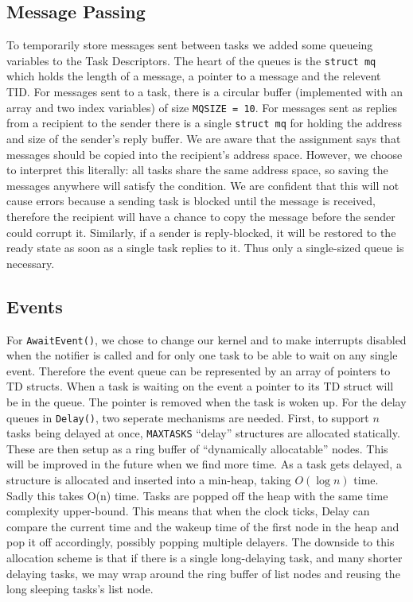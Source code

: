 \documentclass{article}
\begin{document}
\subsection{Message Passing}
To temporarily store messages sent between tasks we added some queueing
variables to the Task Descriptors. The heart of the queues is the \texttt{struct
mq} which holds the length of a message, a pointer to a message and the relevent
TID. For messages sent to a task, there is a circular buffer (implemented with
an array and two index variables) of size \texttt{MQSIZE = 10}. For messages
sent as replies from a recipient to the sender there is a single \texttt{struct
mq} for holding the address and size of the sender's reply buffer. We are aware
that the assignment says that messages should be copied into the recipient's
address space.  However, we choose to interpret this literally: all tasks share
the same address space, so saving the messages anywhere will satisfy the
condition. We are confident that this will not cause errors because a sending
task is blocked until the message is received, therefore the recipient will have
a chance to copy the message before the sender could corrupt it. Similarly, if a
sender is reply-blocked, it will be restored to the ready state as soon as a
single task replies to it. Thus only a single-sized queue is necessary.

\subsection{Events}
For \texttt{AwaitEvent()}, we chose to change our kernel and to make interrupts
disabled when the notifier is called and for only one task to be able to wait on
any single event.  Therefore the event queue can be represented by an array of
pointers to TD structs. When a task is waiting on the event a pointer to its TD
struct will be in the queue. The pointer is removed when the task is woken up.
For the delay queues in \texttt{Delay()}, two seperate mechanisms are needed.
First, to support $n$ tasks being delayed at once, \texttt{MAXTASKS} ``delay''
structures are allocated statically.  These are then setup as a ring buffer of
``dynamically allocatable'' nodes. This will be improved in the future when we
find more time.  As a task gets delayed, a structure is allocated and inserted
into a min-heap, taking $O(\log n)$ time.  Sadly this takes O(n) time. Tasks are
popped off the heap with the same time complexity upper-bound.  This means that
when the clock ticks, Delay can compare the current time and the wakeup time of
the first node in the heap and pop it off accordingly, possibly popping multiple
delayers. The downside to this allocation scheme is that if there is a single
long-delaying task, and many shorter delaying tasks, we may wrap around the ring
buffer of list nodes and reusing the long sleeping tasks's list node. 
\end{document}
